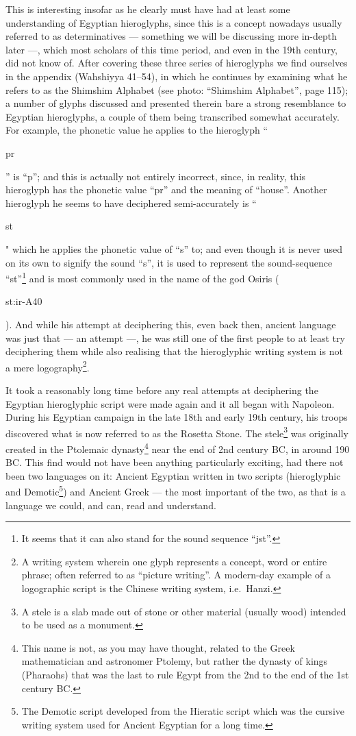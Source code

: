 	This is interesting insofar as he clearly must have had at least some understanding of Egyptian hieroglyphs, since this is a concept nowadays usually referred to as determinatives — something we will be discussing more in-depth later —, which most scholars of this time period, and even in the 19th century, did not know of.
	After covering these three series of hieroglyphs we find ourselves in the appendix (Wahshiyya 41–54), in which he continues by examining what he refers to as the Shimshim Alphabet (see photo: “Shimshim Alphabet”, page 115); a number of glyphs discussed and presented therein bare a strong resemblance to Egyptian hieroglyphs, a couple of them being transcribed somewhat accurately. For example, the phonetic value he applies to the hieroglyph “\begin{hieroglyph}pr\end{hieroglyph}” is “p”; and this is actually not entirely incorrect, since, in reality, this hieroglyph has the phonetic value “pr” and the meaning of “house”. Another hieroglyph he seems to have deciphered semi-accurately is “\begin{hieroglyph}st\end{hieroglyph}" which he applies the phonetic value of “s” to; and even though it is never used on its own to signify the sound “s”, it is used to represent the sound-sequence “st”\footnote{It seems that it can also stand for the sound sequence “jst”.} and is most commonly used in the name of the god Osiris (\begin{hieroglyph}st:ir-A40\end{hieroglyph}).
	And while his attempt at deciphering this, even back then, ancient language was just that — an attempt —, he was still one of the first people to at least try deciphering them while also realising that the hieroglyphic writing system is not a mere logography\footnote{A writing system wherein one glyph represents a concept, word or entire phrase; often referred to as “picture writing”. A modern-day example of a logographic script is the Chinese writing system, i.e.\ Hanzi.}. 

	It took a reasonably long time before any real attempts at deciphering the Egyptian hieroglyphic script were made again and it all began with Napoleon. During his Egyptian campaign in the late 18th and early 19th century, his troops discovered what is now referred to as the Rosetta Stone. The stele\footnote{A stele is a slab made out of stone or other material (usually wood) intended to be used as a monument.} was originally created in the Ptolemaic dynasty\footnote{This name is not, as you may have thought, related to the Greek mathematician and astronomer Ptolemy, but rather the dynasty of kings (Pharaohs) that was the last to rule Egypt from the 2nd to the end of the 1st century BC.} near the end of 2nd century BC, in around 190 BC. This find would not have been anything particularly exciting, had there not been two languages on it: Ancient Egyptian written in two scripts (hieroglyphic and Demotic\footnote{The Demotic script developed from the Hieratic script which was the cursive writing system used for Ancient Egyptian for a long time.}) and Ancient Greek — the most important of the two, as that is a language we could, and can,  read and understand.
	

